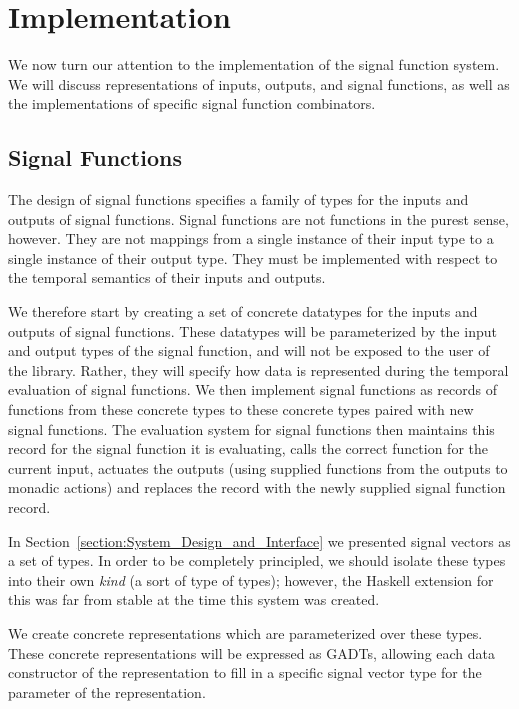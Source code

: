 \section{Implementation}
\label{section:Implementation}

We now turn our attention to the implementation of the signal function
system. We will discuss representations of inputs, outputs, and signal functions,
as well as the implementations of specific signal function combinators.

\subsection{Signal Functions}
\label{subsection:Implementation-Signal_Functions}

The design of signal functions specifies a family of types for the inputs and
outputs of signal functions. Signal functions are not functions in the purest
sense, however. They are not mappings from a single instance of their input
type to a single instance of their output type. They must be implemented with
respect to the temporal semantics of their inputs and outputs.

We therefore start by creating a set of concrete datatypes for the inputs and
outputs of signal functions. These datatypes will be parameterized by the input
and output types of the signal function, and will not be exposed to the user of
the library. Rather, they will specify how data is represented during the
temporal evaluation of signal functions. We then implement signal functions
as records of functions from these concrete types to these concrete types paired
with new signal functions. The evaluation system for signal functions then
maintains this record for the signal function it is evaluating, calls the
correct function for the current input, actuates the outputs (using supplied
functions from the outputs to monadic actions) and replaces the record with the
newly supplied signal function record.

In Section~\ref{section:System_Design_and_Interface} we presented signal vectors
as a set of types. In order to be completely principled, we should isolate these
types into their own {\em kind} (a sort of type of types); however, the Haskell
extension for this was far from stable at the time this system was created.

We create concrete representations which are parameterized over
these types. These concrete representations will be expressed as GADTs, allowing
each data constructor of the representation to fill in a specific signal vector
type for the parameter of the representation.

